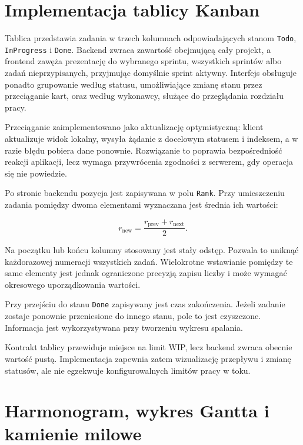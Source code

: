 \section{Implementacja tablicy Kanban}

Tablica przedstawia zadania w trzech kolumnach odpowiadających stanom \texttt{Todo}, \texttt{InProgress} i \texttt{Done}. Backend zwraca zawartość obejmującą cały projekt, a frontend zawęża prezentację do wybranego sprintu, wszystkich sprintów albo zadań nieprzypisanych, przyjmując domyślnie sprint aktywny. Interfejs obsługuje ponadto grupowanie według statusu, umożliwiające zmianę stanu przez przeciąganie kart, oraz według wykonawcy, służące do przeglądania rozdziału pracy.

Przeciąganie zaimplementowano jako aktualizację optymistyczną: klient aktualizuje widok lokalny, wysyła żądanie z docelowym statusem i indeksem, a w razie błędu pobiera dane ponownie. Rozwiązanie to poprawia bezpośredniość reakcji aplikacji, lecz wymaga przywrócenia zgodności z serwerem, gdy operacja się nie powiedzie.

Po stronie backendu pozycja jest zapisywana w polu \texttt{Rank}. Przy umieszczeniu zadania pomiędzy dwoma elementami wyznaczana jest średnia ich wartości:

\begin{equation}
    r_{\mathrm{new}} =
    \frac{r_{\mathrm{prev}} + r_{\mathrm{next}}}{2}.
    \label{eq:rank-zadania}
\end{equation}

Na początku lub końcu kolumny stosowany jest stały odstęp. Pozwala to uniknąć każdorazowej numeracji wszystkich zadań. Wielokrotne wstawianie pomiędzy te same elementy jest jednak ograniczone precyzją zapisu liczby i może wymagać okresowego uporządkowania wartości.

Przy przejściu do stanu \texttt{Done} zapisywany jest czas zakończenia. Jeżeli zadanie zostaje ponownie przeniesione do innego stanu, pole to jest czyszczone. Informacja jest wykorzystywana przy tworzeniu wykresu spalania.

Kontrakt tablicy przewiduje miejsce na limit WIP, lecz backend zwraca obecnie wartość pustą. Implementacja zapewnia zatem wizualizację przepływu i zmianę statusów, ale nie egzekwuje konfigurowalnych limitów pracy w toku.

\section{Harmonogram, wykres Gantta i kamienie milowe}

